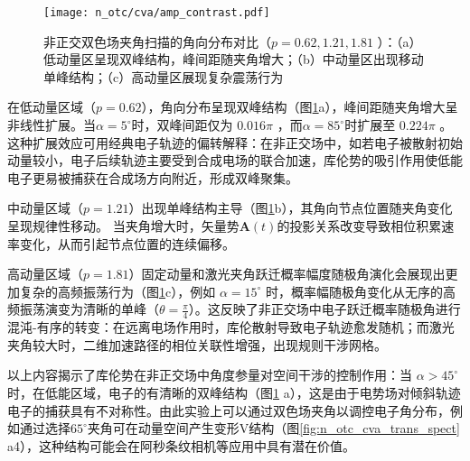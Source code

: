 \begin{figure}[!htbp]
	\centering
	\texttt{[image: n\_otc/cva/amp\_contrast.pdf]}
	\caption{非正交双色场夹角扫描的角向分布对比（$p=0.62,1.21,1.81$ ）：（a）低动量区呈现双峰结构，峰间距随夹角增大；（b）中动量区出现移动单峰结构；（c）高动量区展现复杂震荡行为}
	\label{amp_contrast}
\end{figure}

在低动量区域（$p=0.62$），角向分布呈现双峰结构（图\ref{amp_contrast}a），峰间距随夹角增大呈非线性扩展。当$\alpha=5^\circ$时，双峰间距仅为 $0.016\pi$ ，而$\alpha=85^\circ$时扩展至 $0.224 \pi$ 。这种扩展效应可用经典电子轨迹的偏转解释：在非正交场中，如若电子被散射初始动量较小，电子后续轨迹主要受到合成电场的联合加速，库伦势的吸引作用使低能电子更易被捕获在合成场方向附近，形成双峰聚集。

中动量区域（$p=1.21$）出现单峰结构主导（图\ref{amp_contrast}b），其角向节点位置随夹角变化呈现规律性移动。
当夹角增大时，矢量势$\mathbf{A}(t)$的投影关系改变导致相位积累速率变化，从而引起节点位置的连续偏移。

高动量区域（$p=1.81$）固定动量和激光夹角跃迁概率幅度随极角演化会展现出更加复杂的高频振荡行为（图\ref{amp_contrast}c），例如 $\alpha = 15^\circ$ 时，概率幅随极角变化从无序的高频振荡演变为清晰的单峰（$\theta=\frac{\pi}{4}$）。这反映了非正交场中电子跃迁概率随极角进行混沌-有序的转变：在远离电场作用时，库伦散射导致电子轨迹愈发随机；而激光夹角较大时，二维加速路径的相位关联性增强，出现规则干涉网格。

以上内容揭示了库伦势在非正交场中角度参量对空间干涉的控制作用：当 $\alpha>45^\circ$ 时，在低能区域，电子的有清晰的双峰结构（图\ref{amp_contrast} a），这是由于电势场对倾斜轨迹电子的捕获具有不对称性。由此实验上可以通过双色场夹角以调控电子角分布，例如通过选择$65^\circ$夹角可在动量空间产生变形V结构（图\ref{fig:n_otc_cva_trans_spect} a4），这种结构可能会在阿秒条纹相机等应用中具有潜在价值。


